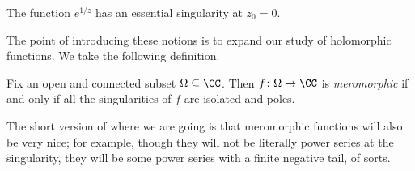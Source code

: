 \begin{example}
	The function $e^{1/z}$ has an essential singularity at $z_0=0$.
\end{example}
The point of introducing these notions is to expand our study of holomorphic functions. We take the following definition.
\begin{definition}[Meromorphic]
	Fix an open and connected subset $\Omega\subseteq\CC$. Then $f\colon \Omega\to\CC$ is \textit{meromorphic} if and only if all the singularities of $f$ are isolated and poles.
\end{definition}
The short version of where we are going is that meromorphic functions will also be very nice; for example, though they will not be literally power series at the singularity, they will be some power series with a finite negative tail, of sorts.

